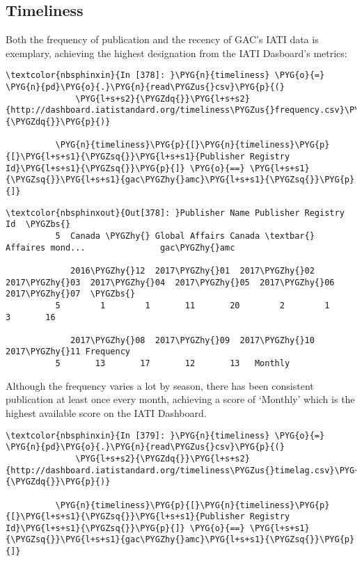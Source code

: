 \documentclass[letterpaper,10pt,english]{sphinxmanual}
\begin{document}
\subsection{Timeliness}
\label{\detokenize{Global Affairs Canada - Compliance Report:Timeliness}}
Both the frequency of publication and the recency of GAC's IATI data is
exemplary, achieving the highest designation from the IATI Dasboard's
metrics:

\begin{Verbatim}[commandchars=\\\{\}]
\textcolor{nbsphinxin}{In [378]: }\PYG{n}{timeliness} \PYG{o}{=} \PYG{n}{pd}\PYG{o}{.}\PYG{n}{read\PYGZus{}csv}\PYG{p}{(}
              \PYG{l+s+s2}{\PYGZdq{}}\PYG{l+s+s2}{http://dashboard.iatistandard.org/timeliness\PYGZus{}frequency.csv}\PYG{l+s+s2}{\PYGZdq{}}\PYG{p}{)}
          
          \PYG{n}{timeliness}\PYG{p}{[}\PYG{n}{timeliness}\PYG{p}{[}\PYG{l+s+s1}{\PYGZsq{}}\PYG{l+s+s1}{Publisher Registry Id}\PYG{l+s+s1}{\PYGZsq{}}\PYG{p}{]} \PYG{o}{==} \PYG{l+s+s1}{\PYGZsq{}}\PYG{l+s+s1}{gac\PYGZhy{}amc}\PYG{l+s+s1}{\PYGZsq{}}\PYG{p}{]}
\end{Verbatim}

\begin{Verbatim}[commandchars=\\\{\}]
\textcolor{nbsphinxout}{Out[378]: }Publisher Name Publisher Registry Id  \PYGZbs{}
          5  Canada \PYGZhy{} Global Affairs Canada \textbar{} Affaires mond...               gac\PYGZhy{}amc
          
             2016\PYGZhy{}12  2017\PYGZhy{}01  2017\PYGZhy{}02  2017\PYGZhy{}03  2017\PYGZhy{}04  2017\PYGZhy{}05  2017\PYGZhy{}06  2017\PYGZhy{}07  \PYGZbs{}
          5        1        1       11       20        2        1        3       16
          
             2017\PYGZhy{}08  2017\PYGZhy{}09  2017\PYGZhy{}10  2017\PYGZhy{}11 Frequency
          5       13       17       12       13   Monthly
\end{Verbatim}

Although the frequency varies a lot by season, there has been consistent
publication at least once every month, achieving a score of `Monthly'
which is the highest available score on the IATI Dashboard.

\begin{Verbatim}[commandchars=\\\{\}]
\textcolor{nbsphinxin}{In [379]: }\PYG{n}{timeliness} \PYG{o}{=} \PYG{n}{pd}\PYG{o}{.}\PYG{n}{read\PYGZus{}csv}\PYG{p}{(}
              \PYG{l+s+s2}{\PYGZdq{}}\PYG{l+s+s2}{http://dashboard.iatistandard.org/timeliness\PYGZus{}timelag.csv}\PYG{l+s+s2}{\PYGZdq{}}\PYG{p}{)}
          
          \PYG{n}{timeliness}\PYG{p}{[}\PYG{n}{timeliness}\PYG{p}{[}\PYG{l+s+s1}{\PYGZsq{}}\PYG{l+s+s1}{Publisher Registry Id}\PYG{l+s+s1}{\PYGZsq{}}\PYG{p}{]} \PYG{o}{==} \PYG{l+s+s1}{\PYGZsq{}}\PYG{l+s+s1}{gac\PYGZhy{}amc}\PYG{l+s+s1}{\PYGZsq{}}\PYG{p}{]}
\end{Verbatim}
\end{document}
